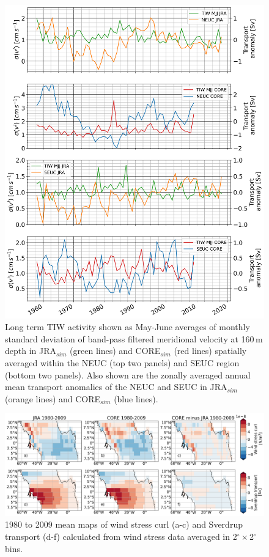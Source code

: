 \documentclass[os, manuscript]{copernicus}
\begin{document}
	\clearpage
	\begin{figure}[t]
		\includegraphics[width=12cm]{../../figures/paper/fA4_INALT20_JRA_CORE_TIW_NEUC_SEUC_MJJ_ts.png}
		\caption{Long term TIW activity shown as May-June averages of monthly standard deviation of band-pass filtered meridional velocity at 160$\,$m depth in JRA$_{sim}$ (green lines) and CORE$_{sim}$ (red lines) spatially averaged within the NEUC (top two panels) and SEUC region (bottom two panels). Also shown are the zonally averaged annual mean transport anomalies of the NEUC and SEUC in JRA$_{sim}$ (orange lines) and CORE$_{sim}$ (blue lines).}
		\label{fig_TIW_long_term}
	\end{figure}
	\clearpage
	\begin{figure}[t]
		\includegraphics[width=12cm]{../../figures/paper/fA5_2deg_INALT20_curl_and_sverdrup_maps_mean_1980_2009.png}
		\caption{1980 to 2009 mean maps of wind stress curl (a-c) and Sverdrup transport (d-f) calculated from wind stress data averaged in 2$^{\circ} \times$2$^{\circ}$ bins.}
		\label{fig_curl_coarse}
	\end{figure}
	\noappendix     
	
\end{document}
